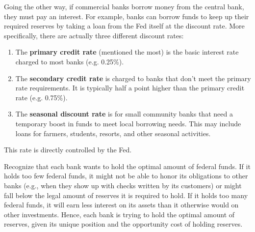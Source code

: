 \documentclass{article}
\begin{document}
      \begin{definition}
        Going the other way, if commercial banks borrow money from the central bank, they must pay an interest. For example, banks can borrow funds to keep up their required reserves by taking a loan from the Fed itself at the discount rate. More specifically, there are actually three different discount rates: 
        \begin{enumerate}
          \item The \textbf{primary credit rate} (mentioned the most) is the basic interest rate charged to most banks (e.g. 0.25\%). 
          \item The \textbf{secondary credit rate} is charged to banks that don't meet the primary rate requirements. It is typically half a point higher than the primary credit rate (e.g. 0.75\%). 
          \item The \textbf{seasonal discount rate} is for small community banks that need a temporary boost in funds to meet local borrowing needs. This may include loans for farmers, students, resorts, and other seasonal activities. 
        \end{enumerate}
        This rate is directly controlled by the Fed. 
      \end{definition}

      Recognize that each bank wants to hold the optimal amount of federal funds. If it holds too few federal funds, it might not be able to honor its obligations to other banks (e.g., when they show up with checks written by its customers) or might fall below the legal amount of reserves it is required to hold. If it holds too many federal funds, it will earn less interest on its assets than it otherwise would on other investments. Hence, each bank is trying to hold the optimal amount of reserves, given its unique position and the opportunity cost of holding reserves. 
\end{document}
